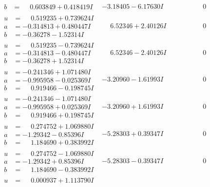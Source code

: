 \documentclass[1p]{elsarticle_modified}
\theoremstyle{definition}
\begin{document}
$$\begin{array}{c|c|c}
\begin{aligned}
b &= \phantom{-}0.603849 + 0.418419 I\end{aligned}
 & -3.18405 - 6.17630 I & \phantom{-0.000000 } 0 \\ \hline\begin{aligned}
u &= \phantom{-}0.519235 + 0.739624 I \\
a &= -0.314813 + 0.480447 I \\
b &= -0.36278 - 1.52314 I\end{aligned}
 & \phantom{-}6.52346 + 2.40126 I & \phantom{-0.000000 } 0 \\ \hline\begin{aligned}
u &= \phantom{-}0.519235 - 0.739624 I \\
a &= -0.314813 - 0.480447 I \\
b &= -0.36278 + 1.52314 I\end{aligned}
 & \phantom{-}6.52346 - 2.40126 I & \phantom{-0.000000 } 0 \\ \hline\begin{aligned}
u &= -0.241346 + 1.071480 I \\
a &= -0.995958 - 0.025369 I \\
b &= \phantom{-}0.919466 - 0.198745 I\end{aligned}
 & -3.20960 - 1.61993 I & \phantom{-0.000000 } 0 \\ \hline\begin{aligned}
u &= -0.241346 - 1.071480 I \\
a &= -0.995958 + 0.025369 I \\
b &= \phantom{-}0.919466 + 0.198745 I\end{aligned}
 & -3.20960 + 1.61993 I & \phantom{-0.000000 } 0 \\ \hline\begin{aligned}
u &= \phantom{-}0.274752 + 1.069880 I \\
a &= -1.29342 - 0.85396 I \\
b &= \phantom{-}1.184690 + 0.383992 I\end{aligned}
 & -5.28303 + 0.39347 I & \phantom{-0.000000 } 0 \\ \hline\begin{aligned}
u &= \phantom{-}0.274752 - 1.069880 I \\
a &= -1.29342 + 0.85396 I \\
b &= \phantom{-}1.184690 - 0.383992 I\end{aligned}
 & -5.28303 - 0.39347 I & \phantom{-0.000000 } 0 \\ \hline\begin{aligned}
u &= \phantom{-}0.000937 + 1.113790 I \\

\end{aligned}
\end{array}$$
\end{document}
